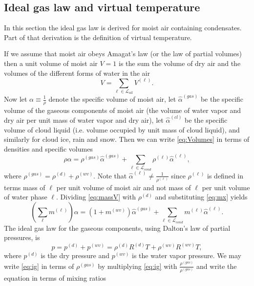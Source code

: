 \documentclass{agujournal}
\begin{document}
{%
\subsection{Ideal gas law and virtual temperature}\label{sec:tv}
In this section the ideal gas law is derived for moist air containing condensates. Part of that derivation is the definition of virtual temperature. 

If we assume that moist air obeys Amagat's law (or the law of partial volumes) then a unit volume of moist air $V=1$ is the sum the volume of dry air and the volumes of the different forms of water in the air
\begin{equation}
V=\sum_{\ell \in \mathcal{L}_{all}} V^{(\ell)}.\label{eq:Volumes}
\end{equation}
Now let $\alpha\equiv \frac{1}{\rho}$ denote the specific volume of moist air, let $\hat{\alpha}^{(gas)}$ be the specific volume of the gaseous components of moist air (the volume of water vapor and dry air per unit mass of water vapor and dry air), let $\hat{\alpha}^{(cl)}$ be the specific volume of cloud liquid (i.e. volume occupied by unit mass of cloud liquid), and similarly for cloud ice, rain and snow. Then we can write \eqref{eq:Volumes} in terms of densities and specific volumes
\begin{equation}
\rho \alpha=\rho^{(gas)}\hat{\alpha}^{(gas)}+\sum_{\ell\in \mathcal{L}_{cond}}\rho^{(\ell)}\hat{\alpha}^{(\ell)},\label{eq:massV}
\end{equation}
where $\rho^{(gas)}=\rho^{(d)}+\rho^{(wv)}$. Note that $\hat{\alpha}^{(\ell)}\neq \frac{1}{\rho^{(\ell)}}$ since $\rho^{(\ell)}$ is defined in terms mass of $\ell$ per unit volume of moist air and not mass of $\ell$ per unit volume of water phase $\ell$. Dividing \eqref{eq:massV} with $\rho^{(d)}$ and substituting \eqref{eq:mx} yields
\begin{equation}
  \left(\sum_\ell m^{(\ell)}\right) \alpha = \left( 1+m^{(wv)}\right) \hat{\alpha}^{(gas)}+\sum_{\ell\in \mathcal{L}_{cond}}m^{(\ell)}\hat{\alpha}^{(\ell)}.\label{eq:vol}
\end{equation}
The ideal gas law for the gaseous components, using Dalton's law of partial pressures, is
\begin{equation}
p=p^{(d)}+p^{(wv)}=\rho^{(d)} R^{(d)} T+\rho^{(wv)} R^{(wv)} T,\label{eq:ig}
\end{equation}
where $p^{(d)}$ is the dry pressure and $p^{(wv)}$ is the water vapor pressure. We may write \eqref{eq:ig} in terms of $\rho^{(gas)}$ by multiplying \eqref{eq:ig} with $\frac{\rho^{(gas)}}{\rho^{(gas)}}$ and write the equation in terms of mixing ratios
}
\end{document}

